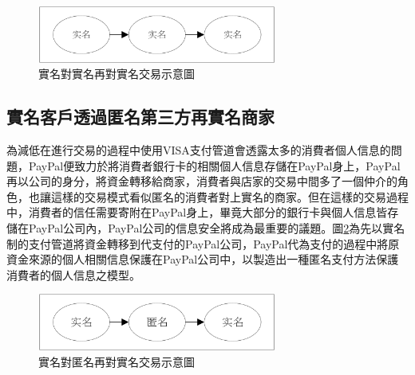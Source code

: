 		\begin{figure}[h]
			\centering
			\includegraphics[width = 0.7\textwidth]{modennn.png}
			\caption{實名對實名再對實名交易示意圖}\label{modennn}
		\end{figure}

		\subsection{實名客戶透過匿名第三方再實名商家}
		為減低在進行交易的過程中使用VISA支付管道會透露太多的消費者個人信息的問題，PayPal便致力於將消費者銀行卡的相關個人信息存儲在PayPal身上，PayPal再以公司的身分，將資金轉移給商家，消費者與店家的交易中間多了一個仲介的角色，也讓這樣的交易模式看似匿名的消費者對上實名的商家。但在這樣的交易過程中，消費者的信任需要寄附在PayPal身上，畢竟大部分的銀行卡與個人信息皆存儲在PayPal公司內，PayPal公司的信息安全將成為最重要的議題。圖\ref{modenan}為先以實名制的支付管道將資金轉移到代支付的PayPal公司，PayPal代為支付的過程中將原資金來源的個人相關信息保護在PayPal公司中，以製造出一種匿名支付方法保護消費者的個人信息之模型。

		\begin{figure}[h]
			\centering
			\includegraphics[width = 0.7\textwidth]{modenan.png}
			\caption{實名對匿名再對實名交易示意圖}\label{modenan}
		\end{figure}

